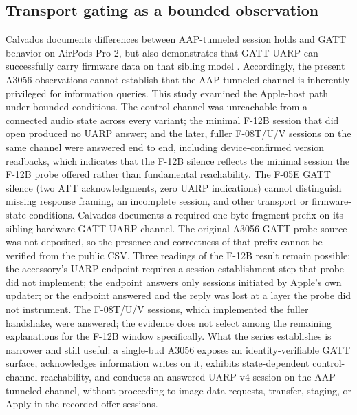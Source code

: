 \documentclass[11pt,letterpaper]{article}
\begin{document}
\subsection{Transport gating as a bounded observation}
Calvados documents differences between AAP-tunneled session holds and GATT behavior on AirPods Pro 2, but also demonstrates that GATT UARP can successfully carry firmware data on that sibling model \cite{calvados}. Accordingly, the present A3056 observations cannot establish that the AAP-tunneled channel is inherently privileged for information queries. This study examined the Apple-host path under bounded conditions. The control channel was unreachable from a connected audio state across every variant; the minimal F-12B session that did open produced no UARP answer; and the later, fuller F-08T/U/V sessions on the same channel were answered end to end, including device-confirmed version readbacks, which indicates that the F-12B silence reflects the minimal session the F-12B probe offered rather than fundamental reachability. The F-05E GATT silence (two ATT acknowledgments, zero UARP indications) cannot distinguish missing response framing, an incomplete session, and other transport or firmware-state conditions. Calvados documents a required one-byte fragment prefix on its sibling-hardware GATT UARP channel. The original A3056 GATT probe source was not deposited, so the presence and correctness of that prefix cannot be verified from the public CSV. Three readings of the F-12B result remain possible: the accessory's UARP endpoint requires a session-establishment step that probe did not implement; the endpoint answers only sessions initiated by Apple's own updater; or the endpoint answered and the reply was lost at a layer the probe did not instrument. The F-08T/U/V sessions, which implemented the fuller handshake, were answered; the evidence does not select among the remaining explanations for the F-12B window specifically. What the series establishes is narrower and still useful: a single-bud A3056 exposes an identity-verifiable GATT surface, acknowledges information writes on it, exhibits state-dependent control-channel reachability, and conducts an answered UARP v4 session on the AAP-tunneled channel, without proceeding to image-data requests, transfer, staging, or Apply in the recorded offer sessions.
\end{document}
